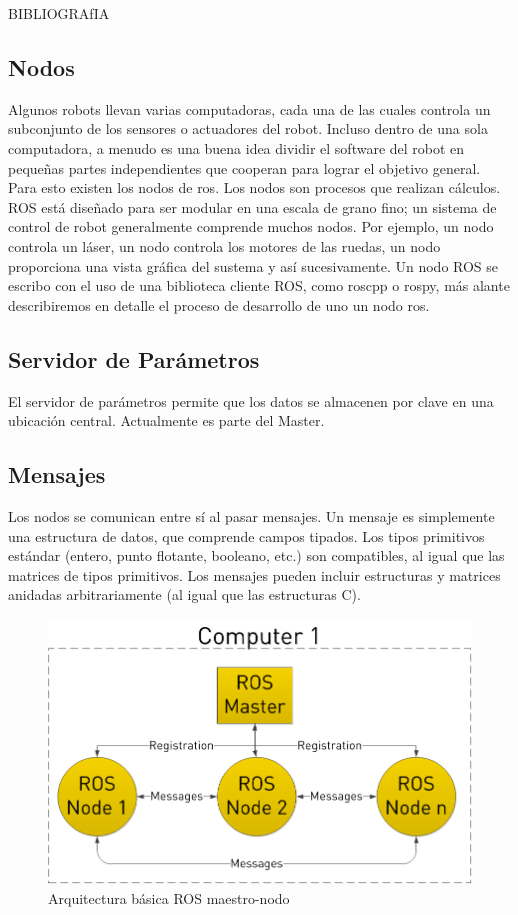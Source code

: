 BIBLIOGRAfIA

\subsection{Nodos}
Algunos robots llevan varias computadoras, cada una de las cuales controla un subconjunto de los sensores o actuadores del robot. Incluso dentro de una sola computadora, a menudo es una buena idea dividir el software del robot en pequeñas partes independientes que cooperan para lograr el objetivo general. Para esto existen los nodos de ros.
Los nodos son procesos que realizan cálculos. ROS está diseñado para ser modular en una escala de grano fino; un sistema de control de robot generalmente comprende muchos nodos.
Por ejemplo, un nodo controla un láser, un nodo controla los motores de las ruedas, un nodo proporciona una vista gráfica del sustema y así sucesivamente. Un nodo ROS se escribo con el uso de una biblioteca cliente ROS, como roscpp o rospy, más alante describiremos en detalle el proceso de desarrollo de uno un nodo ros.

\subsection{Servidor de Parámetros}
El servidor de parámetros permite que los datos se almacenen por clave en una ubicación central. Actualmente es parte del Master.

\subsection{Mensajes}
Los nodos se comunican entre sí al pasar mensajes. Un mensaje es simplemente una estructura de datos, que comprende campos tipados. Los tipos primitivos estándar (entero, punto flotante, booleano, etc.) son compatibles, al igual que las matrices de tipos primitivos. Los mensajes pueden incluir estructuras y matrices anidadas arbitrariamente (al igual que las estructuras C).

\begin{figure}[H]
    \centering
    \includegraphics[scale=0.45]{img/ros-architecture.png}
  	\caption{Arquitectura básica ROS maestro-nodo}
  	\label{fig:ros-arch}
\end{figure}

